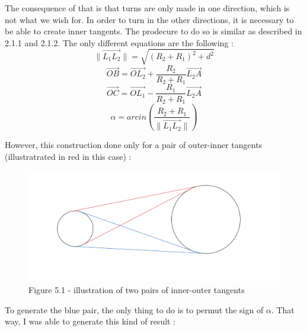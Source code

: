\documentclass[a4paper,12pt,fleqn]{article}
\begin{document}
The consequence of that is that turns are only made in one direction, which is not what we wish for. In order to turn in the other directions, it is necessary to be able to create inner tangents. The prodecure to do so is similar as described in 2.1.1 and 2.1.2. The only different equations are the following :
\[ \lVert \overrightarrow{L_1L_2} \rVert = \sqrt{(R_2 + R_1)^2 + d^2}\]
\[ \overrightarrow{OB} = \overrightarrow{OL_2} + \frac{R_2}{R_2 + R_1}\overrightarrow{L_2A}\]
\[ \overrightarrow{OC} = \overrightarrow{OL_1} - \frac{R_1}{R_2 + R_1}\overrightarrow{L_2A}\]
\[ \alpha = arcin(\frac{R_2 + R_1}{\lVert \overrightarrow{L_1L_2} \rVert})\]

However, this construction done only for a pair of outer-inner tangents (illustratrated in red in this case) :

\begin{figure}[H]
\centering
\includegraphics[width=\textwidth]{tangentsRoad}
Figure 5.1 - illustration of two pairs of inner-outer tangents
\end{figure}

To generate the blue pair, the only thing to do is to permut the sign of \mbox{$\alpha$}. That way, I was able to generate this kind of result :
\end{document}
